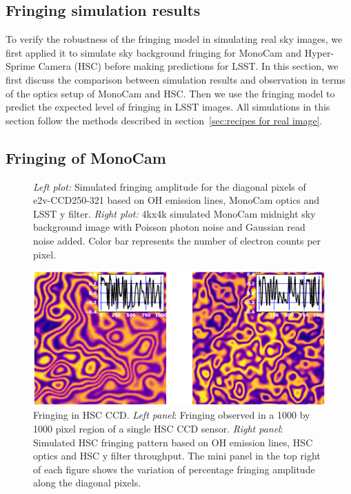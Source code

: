 \documentclass[twocolumn]{aastex63} %
\begin{document}
\begin{CJK*}{UTF8}{gbsn}



\section{Fringing simulation results} \label{sec:real_sky}
To verify the robustness of the fringing model in simulating real sky images, we first applied it to simulate sky background fringing for MonoCam \citep{Brooks17} and Hyper-Sprime Camera (HSC) \citep{Miyazaki18} before making predictions for LSST. In this section, we first discuss the comparison between simulation results and observation in terms of the optics setup of MonoCam and HSC. Then we use the fringing model to predict the expected level of fringing in LSST images. All simulations in this section follow the methods described in section~\ref{sec:recipes for real image}.

\subsection{Fringing of MonoCam} \label{sec: MonoCam sim}
\begin{figure}[thb] 

\centering
{}
\caption{{\it Left plot:} Simulated fringing amplitude for the diagonal pixels of e2v-CCD250-321 based on OH emission lines, MonoCam optics and LSST y filter. {\it Right plot:} 4kx4k simulated MonoCam midnight sky background image with Poisson photon noise and Gaussian read noise added. Color bar represents the number of electron counts per pixel.}
\label{fig:MonoCam_sims}
\end{figure}

\begin{figure}[bt]
\centering
\includegraphics[scale = 0.5]{HSC-data-sim.eps}
\caption{Fringing in HSC CCD. {\it Left panel}: Fringing observed in a 1000 by 1000 pixel region of a single HSC CCD sensor. {\it Right panel}: Simulated HSC fringing pattern based on OH emission lines, HSC optics and HSC y filter throughput. The mini panel in the top right of each figure shows the variation of percentage fringing amplitude along the diagonal pixels.}
\label{fig:HSC_sims}
\end{figure}


\end{CJK*}
\end{document}
